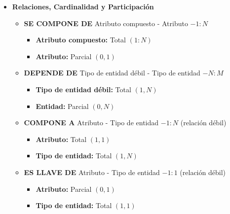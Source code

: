 \begin{itemize}
\begin{itemize}
\begin{enumerate}
            \item El tipo de relación (débil o fuerte) se deduce de las entidades relacionadas.
            \item Un atributo compuesto puede conformarse de atributos tanto simples como compuestos.
            \item Un tipo de entidad es fuerte por default pero, si es definida como débil, debe asociarse siempre, a al menos una entidad, siendo ésta a su vez débil o fuerte.
            \item Una relación siempre une a, al menos, un tipo de entidad.
        \end{enumerate}
    \end{itemize}
    \item \textbf{Relaciones, Cardinalidad y Participación}
    \begin{itemize}
        \item \textbf{SE COMPONE DE} Atributo compuesto - Atributo $- 1:N$
        \begin{itemize}
            \item \textbf{Atributo compuesto:} Total $(1:N)$
            \item \textbf{Atributo:} Parcial $(0,1)$
        \end{itemize}
        \item \textbf{DEPENDE DE} Tipo de entidad débil - Tipo de entidad $- N:M$
        \begin{itemize}
            \item \textbf{Tipo de entidad débil:} Total $(1,N)$
            \item \textbf{Entidad:} Parcial $(0,N)$
        \end{itemize}
        \item \textbf{COMPONE A} Atributo - Tipo de entidad $- 1:N$ (relación débil)
        \begin{itemize}
            \item \textbf{Atributo:} Total $(1,1)$
            \item \textbf{Tipo de entidad:} Total $(1,N)$
        \end{itemize}
        \item \textbf{ES LLAVE DE} Atributo - Tipo de entidad $- 1:1$ (relación débil)
        \begin{itemize}
            \item \textbf{Atributo:} Parcial $(0,1)$
            \item \textbf{Tipo de entidad:} Total $(1,1)$
        \end{itemize}

\end{itemize}
\end{itemize}
